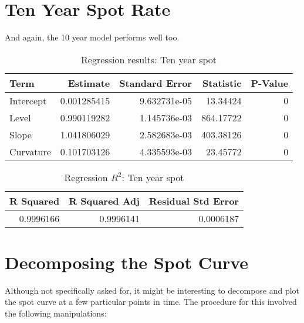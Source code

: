\documentclass[openany]{book}
\theoremstyle{definition}
\theoremstyle{definition}
\theoremstyle{definition}
\theoremstyle{remark}
\begin{document}
\normalsize

\hypertarget{ten-year-spot-rate}{%
\section{Ten Year Spot Rate}\label{ten-year-spot-rate}}

And again, the 10 year model performs well too.

\small

\begin{table}[H]

\caption{\label{tab:ten-year-reg}Regression results: Ten year spot}
\centering
\begin{tabular}[t]{lrrrr}
\toprule
Term & Estimate & Standard Error & Statistic & P-Value\\
\midrule
Intercept & 0.001285415 & 9.632731e-05 & 13.34424 & 0\\
Level & 0.990119282 & 1.145736e-03 & 864.17722 & 0\\
Slope & 1.041806029 & 2.582683e-03 & 403.38126 & 0\\
Curvature & 0.101703126 & 4.335593e-03 & 23.45772 & 0\\
\bottomrule
\end{tabular}
\end{table}

\normalsize

\small

\begin{table}[H]

\caption{\label{tab:ten-year-reg-r2}Regression $R^2$: Ten year spot}
\centering
\begin{tabular}[t]{rrr}
\toprule
R Squared & R Squared Adj & Residual Std Error\\
\midrule
0.9996166 & 0.9996141 & 0.0006187\\
\bottomrule
\end{tabular}
\end{table}

\normalsize

\hypertarget{decomposing-the-spot-curve}{%
\section{Decomposing the Spot Curve}\label{decomposing-the-spot-curve}}

Although not specifically asked for, it might be interesting to
decompose and plot the spot curve at a few particular points in time.
The procedure for this involved the following manipulations:
\end{document}
